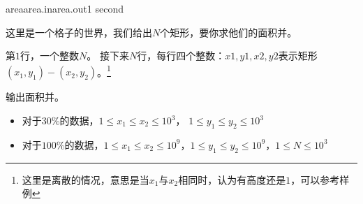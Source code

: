 \documentclass[11pt,a4paper,oneside]{article}
\begin{document}
	
\begin{problem}{area}{area.in}{area.out}{1 second}
	
	这里是一个格子的世界，我们给出$N$个矩形，要你求他们的面积并。
	
	\InputFile
	
	第$1$行，一个整数$N$。
	接下来$N$行，每行四个整数：$x1,y1,x2,y2$表示矩形$(x_1,y_1)-(x_2,y_2)$。\footnote{这里是离散的情况，意思是当$x_1$与$x_2$相同时，认为有高度还是$1$，可以参考样例}
	
	\OutputFile
	
	输出面积并。
	
	\Example
	
	\begin{example}
\end{example}

\Note
\begin{itemize}
	\item 对于$30\%$的数据，$1 \leq x_1 \leq x_2 \leq 10^3$， $1 \leq y_1 \leq y_2 \leq 10^3$
	\item 对于$100\%$的数据，$1 \leq x_1 \leq x_2 \leq 10^9$，$1 \leq y_1 \leq y_2 \leq 10^9$，$1 \leq N \leq 10^3$
\end{itemize}
\end{problem}
\end{document}
